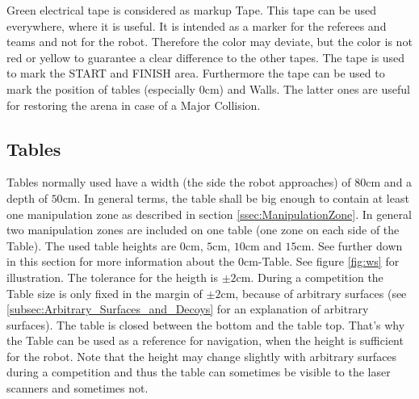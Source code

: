 Green electrical tape is considered as markup Tape. This tape can be used everywhere, where it is useful. It is intended as a marker for the referees and teams and not for the robot. Therefore the color may deviate, but the color is not red or yellow to guarantee a clear difference to the other tapes. The tape is used to mark the START and FINISH area. Furthermore the tape can be used to mark the position of tables (especially $0\si{\centi\meter}$) and Walls. The latter ones are useful for restoring the arena in case of a Major Collision.


\subsection{Tables}
\label{subsec: Tables}




Tables normally used have a width (the side the robot approaches) of $80\si{\centi\meter}$ and a depth of $50\si{\centi\meter}$. In general terms, the table shall be big enough to contain at least one manipulation zone as described in section \ref{ssec:ManipulationZone}. In general two manipulation zones are included on one table (one zone on each side of the Table). The used table heights are $0\si{\centi\meter}$, $5\si{\centi\meter}$, $10\si{\centi\meter}$ and $15\si{\centi\meter}$. See further down in this section for more information about the $0\si{\centi\meter}$-Table. See figure \ref{fig:ws} for illustration. 
The tolerance for the heigth is $\pm 2 \si{\centi\meter}$. During a competition the Table size is only fixed in the margin of $\pm 2 \si{\centi\meter}$, because of arbitrary surfaces (see \ref{subsec:Arbitrary_Surfaces_and_Decoys} for an explanation of arbitrary surfaces). 
The table is closed between the bottom and the table top. That's why the Table can be used as a reference for navigation, when the height is sufficient for the robot. Note that the height may change slightly with arbitrary surfaces during a competition and thus the table can sometimes be visible to the laser scanners and sometimes not. 
 
